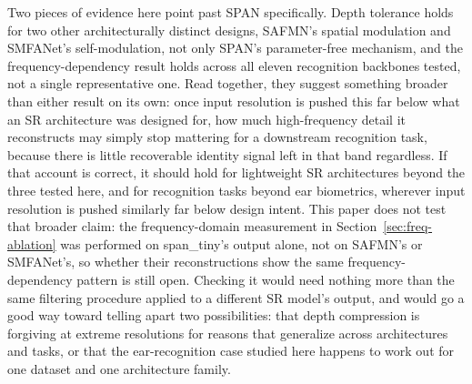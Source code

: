 \documentclass[pdflatex,sn-vancouver-num]{sn-jnl}
\begin{document}
Two pieces of evidence here point past SPAN specifically. Depth tolerance holds for two other architecturally distinct designs, SAFMN's spatial modulation and SMFANet's self-modulation, not only SPAN's parameter-free mechanism, and the frequency-dependency result holds across all eleven recognition backbones tested, not a single representative one. Read together, they suggest something broader than either result on its own: once input resolution is pushed this far below what an SR architecture was designed for, how much high-frequency detail it reconstructs may simply stop mattering for a downstream recognition task, because there is little recoverable identity signal left in that band regardless. If that account is correct, it should hold for lightweight SR architectures beyond the three tested here, and for recognition tasks beyond ear biometrics, wherever input resolution is pushed similarly far below design intent. This paper does not test that broader claim: the frequency-domain measurement in Section~\ref{sec:freq-ablation} was performed on span\_tiny's output alone, not on SAFMN's or SMFANet's, so whether their reconstructions show the same frequency-dependency pattern is still open. Checking it would need nothing more than the same filtering procedure applied to a different SR model's output, and would go a good way toward telling apart two possibilities: that depth compression is forgiving at extreme resolutions for reasons that generalize across architectures and tasks, or that the ear-recognition case studied here happens to work out for one dataset and one architecture family.
\end{document}
